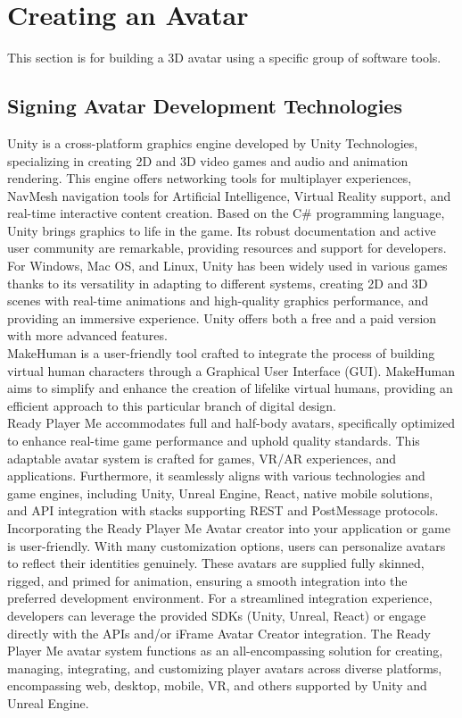\chapter{Creating an Avatar}

This section is for building a 3D avatar using a specific group of software tools.

\section{Signing Avatar Development Technologies}


Unity is a cross-platform graphics engine developed by Unity Technologies, specializing in creating 2D and 3D video games and audio and animation rendering. This engine offers networking tools for multiplayer experiences, NavMesh navigation tools for Artificial Intelligence, Virtual Reality support, and real-time interactive content creation. Based on the C\# programming language, Unity brings graphics to life in the game. Its robust documentation and active user community are remarkable, providing resources and support for developers. For Windows, Mac OS, and Linux, Unity has been widely used in various games thanks to its versatility in adapting to different systems, creating 2D and 3D scenes with real-time animations and high-quality graphics performance, and providing an immersive experience. Unity offers both a free and a paid version with more advanced features.\\

MakeHuman is a user-friendly tool crafted to integrate the process of building virtual human characters through a Graphical User Interface (GUI). MakeHuman aims to simplify and enhance the creation of lifelike virtual humans, providing an efficient approach to this particular branch of digital design. \\

Ready Player Me accommodates full and half-body avatars, specifically optimized to enhance real-time game performance and uphold quality standards. This adaptable avatar system is crafted for games, VR/AR experiences, and applications. Furthermore, it seamlessly aligns with various technologies and game engines, including Unity, Unreal Engine, React, native mobile solutions, and API integration with stacks supporting REST and PostMessage protocols. Incorporating the Ready Player Me Avatar creator into your application or game is user-friendly. With many customization options, users can personalize avatars to reflect their identities genuinely. These avatars are supplied fully skinned, rigged, and primed for animation, ensuring a smooth integration into the preferred development environment. For a streamlined integration experience, developers can leverage the provided SDKs (Unity, Unreal, React) or engage directly with the APIs and/or iFrame Avatar Creator integration. The Ready Player Me avatar system functions as an all-encompassing solution for creating, managing, integrating, and customizing player avatars across diverse platforms, encompassing web, desktop, mobile, VR, and others supported by Unity and Unreal Engine. \\



